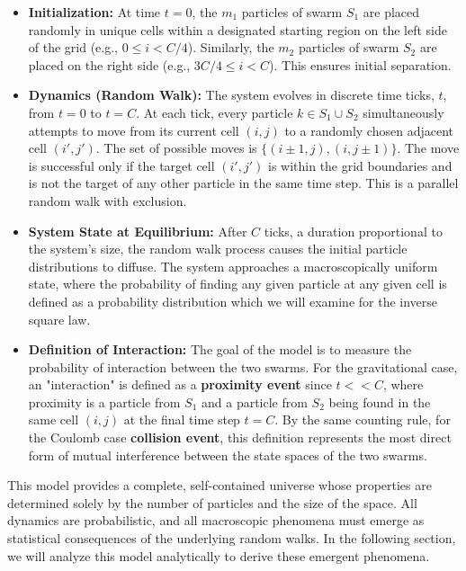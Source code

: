 \documentclass[11pt, letterpaper]{article}
\begin{document}
\begin{itemize}
    \item \textbf{Initialization:} At time $t=0$, the $m_1$ particles of swarm $S_1$ are placed randomly in unique cells within a designated starting region on the left side of the grid (e.g., $0 \le i < C/4$). Similarly, the $m_2$ particles of swarm $S_2$ are placed on the right side (e.g., $3C/4 \le i < C$). This ensures initial separation.

    \item \textbf{Dynamics (Random Walk):} The system evolves in discrete time ticks, $t$, from $t=0$ to $t=C$. At each tick, every particle $k \in S_1 \cup S_2$ simultaneously attempts to move from its current cell $(i,j)$ to a randomly chosen adjacent cell $(i',j')$. The set of possible moves is $\{(i \pm 1, j), (i, j \pm 1)\}$. The move is successful only if the target cell $(i',j')$ is within the grid boundaries and is not the target of any other particle in the same time step. This is a parallel random walk with exclusion.

    \item \textbf{System State at Equilibrium:} After $C$ ticks, a duration proportional to the system's size, the random walk process causes the initial particle distributions to diffuse. The system approaches a macroscopically uniform state, where the probability of finding any given particle at any given cell is defined as a probability distribution which we will examine for the inverse square law.

    \item \textbf{Definition of Interaction:} The goal of the model is to measure the probability of interaction between the two swarms. For the gravitational case, an "interaction" is defined as a \textbf{proximity event} since $t << C$, where proximity is a particle from $S_1$ and a particle from $S_2$ being found in the same cell $(i,j)$ at the final time step $t=C$. By the same counting rule, for the Coulomb case \textbf{collision event}, this definition represents the most direct form of mutual interference between the state spaces of the two swarms.
\end{itemize}

This model provides a complete, self-contained universe whose properties are determined solely by the number of particles and the size of the space. All dynamics are probabilistic, and all macroscopic phenomena must emerge as statistical consequences of the underlying random walks. In the following section, we will analyze this model analytically to derive these emergent phenomena.
\end{document}
